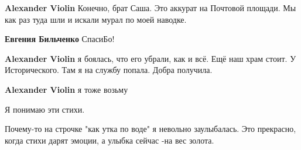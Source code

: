 \begin{itemize}
\begin{itemize}
\textbf{Alexander Violin} Конечно, брат Саша. Это аккурат на Почтовой площади. Мы как раз туда шли и искали мурал по моей наводке.

 
\textbf{Евгения Бильченко} СпасиБо!

 
\textbf{Alexander Violin} я боялась, что его убрали, как и всё. Ещё наш храм стоит. У Исторического. Там я на службу попала. Добра получила.

 
\textbf{Alexander Violin} я тоже возьму
\end{itemize}

 
Я понимаю эти стихи.

 
Почему-то на строчке "как утка по воде" я невольно заулыбалась. Это прекрасно, когда стихи дарят эмоции, а улыбка сейчас -на вес золота.

 

\end{itemize}
